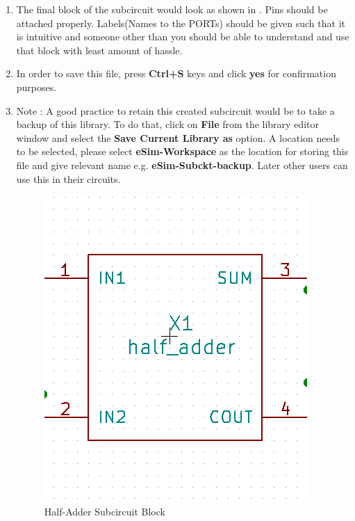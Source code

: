 \begin{itemize}
\begin{enumerate}
        \item The final block of the subcircuit would look as shown in . Pins should be attached properly. Labels(Names to the PORTs) should be given such that it is intuitive and someone other than you should be able to understand and use that block with least amount of hassle.
        
        \item In order to save this file, press \textbf{Ctrl+S} keys and click \textbf{yes} for confirmation purposes. 
        
        \item Note : A good practice to retain this created subcircuit would be to take a backup of this library. To do that, click on \textbf{File} from the library editor window and select the \textbf{Save Current Library as} option. A location needs to be selected, please select \textbf{eSim-Workspace} as the location for storing this file and give relevant name e.g. \textbf{eSim-Subckt-backup}. Later other users can use this in their circuits.
        
        
                    \begin{figure}[!htp]
                        \centering
                        \includegraphics[width =\smfig]{halfadderblock.png}
                        \caption{Half-Adder Subcircuit Block}
                        \label{block}
                    \end{figure}
\end{enumerate}
        

\end{itemize}
